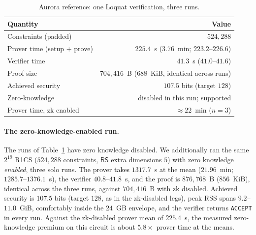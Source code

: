 \begin{table}[H]
\centering
\small
\begin{tabular}{lr}
\toprule
Quantity & Value \\
\midrule
Constraints (padded)        & $524{,}288$ \\
Prover time (setup $+$ prove) & $225.4$~s ($3.76$~min; $223.2$--$226.6$) \\
Verifier time               & $41.3$~s ($41.0$--$41.6$) \\
Proof size                  & $704{,}416$~B ($688$~KiB, identical across runs) \\
Achieved security           & $107.5$ bits (target $128$) \\
Zero-knowledge              & disabled in this run; supported \\
Prover time, zk enabled     & ${\approx}22$~min ($n{=}3$) \\
\bottomrule
\end{tabular}
\caption{Aurora reference: one Loquat verification, three runs.}
\label{tab:aurora-ref}
\end{table}

\paragraph{The zero-knowledge-enabled run.}
The runs of Table~\ref{tab:aurora-ref} have zero knowledge disabled. We additionally ran the same $2^{19}$ R1CS ($524{,}288$ constraints, $\mathsf{RS}$ extra dimensions $5$) with zero knowledge \emph{enabled}, three solo runs. The prover takes $1317.7$~s at the mean ($21.96$~min; $1285.7$--$1376.1$~s), the verifier $40.8$--$41.8$~s, and the proof is $876{,}768$~B ($856$~KiB), identical across the three runs, against $704{,}416$~B with zk disabled. Achieved security is $107.5$ bits (target $128$, as in the zk-disabled legs), peak RSS spans $9.2$--$11.0$~GiB, comfortably inside the $24$~GB envelope, and the verifier returns \texttt{ACCEPT} in every run. Against the zk-disabled prover mean of $225.4$~s, the measured zero-knowledge premium on this circuit is about $5.8\times$ prover time at the means.

